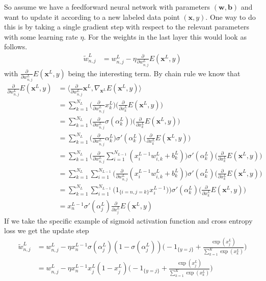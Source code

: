 \documentclass[preprint,12pt,3p]{elsarticle}
\begin{document}
So assume we have a feedforward neural network with parameters $(\mathbf{w},\mathbf{b})$ and want to update it according to a new labeled data point $(\mathbf{x},y)$. One way to do this is by taking a single gradient step with respect to the relevant parameters with some learning rate $\eta$. For the weights in the last layer this would look as follows.
\begin{align*}
    \tilde{w}^L_{n,j}&=w^L_{n,j}-\eta\frac{\partial}{\partial w^L_{n,j}}E(\mathbf{x}^L,y)
\end{align*}
with $\frac{\partial}{\partial w^L_{n,j}}E(\mathbf{x}^L,y)$ being the interesting term. By chain rule we know that
\begin{align*}
    \frac{\partial}{\partial w^L_{n,j}}E(\mathbf{x}^L,y)&=\langle\frac{\partial}{\partial w^L_{n,j}}\mathbf{x}^L,\nabla_{\mathbf{x}^L}E(\mathbf{x}^L,y) \rangle\\
    &=\sum_{k=1}^{N_L}\Big(\frac{\partial}{\partial w^L_{n,j}}x^L_k\Big)\Big(\frac{\partial}{\partial x^L_k}E(\mathbf{x}^L,y)\Big)\\
    &=\sum_{k=1}^{N_L}\Big(\frac{\partial}{\partial w^L_{n,j}}\sigma(\alpha^L_k)\Big)\Big(\frac{\partial}{\partial x^L_k}E(\mathbf{x}^L,y)\Big)\\
    &=\sum_{k=1}^{N_L}\Big(\frac{\partial}{\partial w^L_{n,j}}\alpha_k^L\Big)\sigma'(\alpha^L_k)\Big(\frac{\partial}{\partial x^L_k}E(\mathbf{x}^L,y)\Big)\\
    &=\sum_{k=1}^{N_L}\Big(\frac{\partial}{\partial w^L_{n,j}}\sum_{i=1}^{N_{L-1}}(x^{L-1}_iw^L_{i,k}+b^L_k)\Big)\sigma'(\alpha^L_k)\Big(\frac{\partial}{\partial x^L_k}E(\mathbf{x}^L,y)\Big)\\
    &=\sum_{k=1}^{N_L}\sum_{i=1}^{N_{L-1}}\Big(\frac{\partial}{\partial w^L_{n,j}}(x^{L-1}_iw^L_{i,k}+b^L_k)\Big)\sigma'(\alpha^L_k)\Big(\frac{\partial}{\partial x^L_k}E(\mathbf{x}^L,y)\Big)\\
    &=\sum_{k=1}^{N_L}\sum_{i=1}^{N_{L-1}}\Big(1_{\{i=n,j=k\}}x^{L-1}_i)\Big)\sigma'(\alpha^L_k)\Big(\frac{\partial}{\partial x^L_k}E(\mathbf{x}^L,y)\Big)\\
    &=x^{L-1}_n\sigma'(\alpha^L_j)\frac{\partial}{\partial x^L_j}E(\mathbf{x}^L,y)
\end{align*}
If we take the specific example of sigmoid activation function and cross entropy loss we get the update step
\begin{align*}
    \tilde{w}^L_{n,j}&=w^L_{n,j}-\eta x^{L-1}_n\sigma(\alpha^L_j)(1-\sigma(\alpha^L_j))\Big(-1_{\{y=j\}}+\frac{\exp(x^L_j)}{\sum_{k=1}^K\exp(x_k^L)}\Big)\\
    &=w^L_{n,j}-\eta x^{L-1}_nx^L_j(1-x^L_j)\Big(-1_{\{y=j\}}+\frac{\exp(x^L_j)}{\sum_{k=1}^K\exp(x_k^L)}\Big)
\end{align*}
\end{document}
